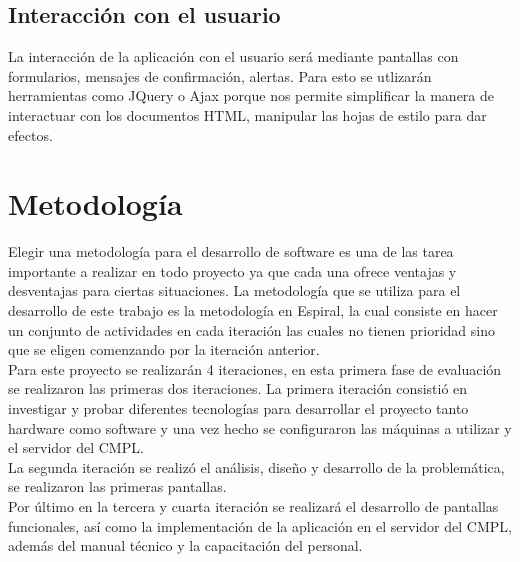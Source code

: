 \subsection{Interacción con el usuario}

La interacción de la aplicación con el usuario será mediante pantallas con formularios, mensajes de confirmación, alertas. Para esto se utlizarán herramientas como JQuery o Ajax porque nos permite simplificar la manera de interactuar con los documentos HTML, manipular las hojas de estilo para dar efectos.

\section{Metodología}

Elegir una metodología para el desarrollo de software es una de las tarea importante a realizar en todo proyecto ya que cada una ofrece ventajas y desventajas para ciertas situaciones. La metodología que se utiliza para el desarrollo de este trabajo es la metodología en Espiral, la cual consiste en hacer un conjunto de actividades en cada iteración las cuales no tienen prioridad sino que se eligen comenzando por la iteración anterior.\\


Para este proyecto se realizarán 4 iteraciones, en esta primera fase de evaluación se realizaron las primeras dos iteraciones. La primera iteración consistió en investigar y probar  diferentes tecnologías para desarrollar el proyecto tanto hardware como software y una vez hecho se configuraron las máquinas a utilizar y el servidor del CMPL. \\
La segunda iteración se realizó el análisis, diseño y desarrollo de la problemática, se realizaron las primeras pantallas.\\

Por último en la tercera y cuarta iteración se realizará el desarrollo de pantallas funcionales, así como la implementación de la aplicación en el servidor del CMPL, además del manual técnico y la capacitación del personal. \\ 

